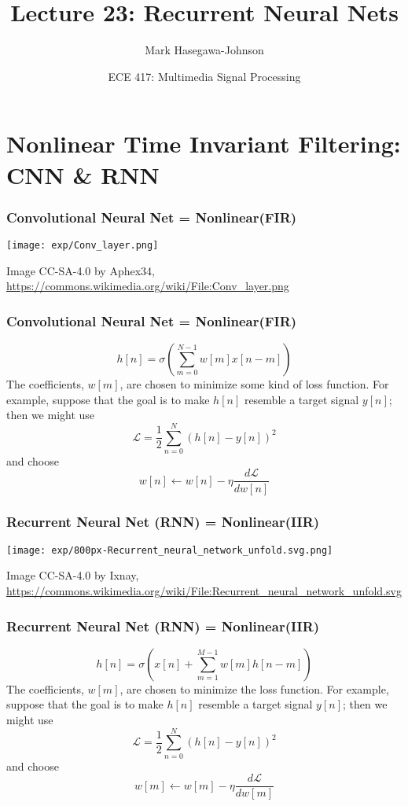 \documentclass{beamer}
\title{Lecture 23: Recurrent Neural Nets}
\author{Mark Hasegawa-Johnson}
\date{ECE 417: Multimedia Signal Processing}
\begin{document}
\begin{frame}
  \maketitle
\end{frame}

\begin{frame}
  \tableofcontents
\end{frame}

\section[CNN/RNN]{Nonlinear Time Invariant Filtering: CNN \& RNN}
\setcounter{subsection}{1}

\begin{frame}
  \frametitle{Convolutional Neural Net = Nonlinear(FIR)}
  \centerline{\texttt{[image: exp/Conv\_layer.png]}}
  \begin{tiny}Image CC-SA-4.0  by Aphex34, \url{https://commons.wikimedia.org/wiki/File:Conv_layer.png}\end{tiny}
\end{frame}

\begin{frame}
  \frametitle{Convolutional Neural Net = Nonlinear(FIR)}
  \[
  h[n] = \sigma\left(\sum_{m=0}^{N-1}w[m]x[n-m]\right)
  \]
  The coefficients, $w[m]$, are chosen to minimize some kind of loss
  function.  For example, suppose that the goal is to make $h[n]$
  resemble a target signal $y[n]$; then we might use
  \[
  {\mathcal L} = \frac{1}{2}\sum_{n=0}^N\left(h[n]-y[n]\right)^2
  \]
  and choose
  \[
  w[n] \leftarrow w[n]-\eta\frac{d{\mathcal L}}{dw[n]}
  \]
\end{frame}

\begin{frame}
  \frametitle{Recurrent Neural Net (RNN) = Nonlinear(IIR)}
  \centerline{\texttt{[image: exp/800px-Recurrent\_neural\_network\_unfold.svg.png]}}
  \begin{tiny}Image CC-SA-4.0  by Ixnay, \url{https://commons.wikimedia.org/wiki/File:Recurrent_neural_network_unfold.svg}\end{tiny}
\end{frame}

\begin{frame}
  \frametitle{Recurrent Neural Net (RNN) = Nonlinear(IIR)}
  \[
  h[n] = \sigma\left(x[n] + \sum_{m=1}^{M-1}w[m] h[n-m]\right)
  \]
  The coefficients, $w[m]$, are chosen to minimize the loss function.
  For example, suppose that the goal is to make $h[n]$ resemble a
  target signal $y[n]$; then we might use 
  \[
  {\mathcal L} = \frac{1}{2}\sum_{n=0}^N\left(h[n]-y[n]\right)^2
  \]
  and choose
  \[
  w[m] \leftarrow w[m]-\eta\frac{d{\mathcal L}}{dw[m]}
  \]
\end{frame}
\end{document}
